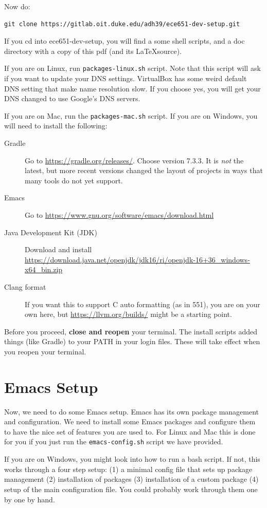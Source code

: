 \documentclass[12pt]{article}
\begin{document}
Now do:
\begin{verbatim}
git clone https://gitlab.oit.duke.edu/adh39/ece651-dev-setup.git
\end{verbatim}

If you cd into ece651-dev-setup, you will find a some shell
scripts, and a doc directory with a copy of this pdf (and its \LaTeX source).


If you are on Linux, run \verb+packages-linux.sh+ script.  Note that this script
will ask if you want to update your DNS settings. VirtualBox has some weird default
DNS setting that make name resolution slow.  If you choose yes, you will get your DNS
changed to use Google's DNS servers.

If you are on Mac, run the \verb+packages-mac.sh+ script.
If you are on Windows, you will need to install the following:
\begin{description}
\item[Gradle] Go to \url{https://gradle.org/releases/}. Choose version 7.3.3.  It is \emph{not}
  the latest, but more recent versions changed the layout of projects in ways that many tools
  do not yet support.
\item[Emacs] Go to \url{https://www.gnu.org/software/emacs/download.html}
\item[Java Development Kit (JDK)] Download and install \url{https://download.java.net/openjdk/jdk16/ri/openjdk-16+36_windows-x64_bin.zip}
\item[Clang format] If you want this to support C auto formatting (as
  in 551), you are on your own here, but
  \url{https://llvm.org/builds/} might be a starting point.
\end{description}

Before you proceed, \textbf{close and reopen} your terminal. The install scripts added
things (like Gradle) to your PATH in your login files.  These will take effect when
you reopen your terminal.

\section{Emacs Setup}
Now, we need to do some Emacs setup.  Emacs has its own package management
and configuration.  We need to install some Emacs packages and configure them
to have the nice set of features you are used to.  For Linux and Mac this is
done for you if you just run the \verb+emacs-config.sh+ script we have provided.

If you are on Windows, you might look into how to run a bash script.  If not,
this works through a four step setup: (1) a minimal config file that sets
up package management (2) installation of packages (3) installation of a custom
package (4) setup of the main configuration file.  You could probably work through
them one by one by hand. 
\end{document}
